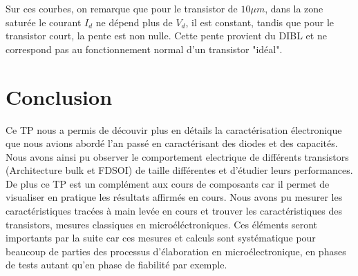 \documentclass[a4paper,11pt]{report}
\begin{document}
Sur ces courbes, on remarque que pour le transistor de $10\mu m$, dans la zone saturée le courant $I_d$ ne dépend plus de $V_d$, il est constant, tandis que pour le transistor court, la pente est non nulle. Cette pente provient du DIBL et ne correspond pas au fonctionnement normal d'un transistor "idéal".

\chapter*{Conclusion}

Ce TP nous a permis de découvir plus en détails la caractérisation électronique que nous avions abordé l'an passé en caractérisant des diodes et des capacités. Nous avons ainsi pu observer le comportement electrique de différents transistors (Architecture bulk et FDSOI) de taille différentes et d'étudier leurs performances. De plus ce TP est un complément aux cours de composants car il permet de visualiser en pratique les résultats affirmés en cours. Nous avons pu mesurer les caractéristiques tracées à main levée en cours et trouver les caractéristiques des transistors, mesures classiques en microéléctroniques. Ces éléments seront importants par la suite car ces mesures et calculs sont systématique pour beaucoup de parties des processus d'élaboration en microélectronique, en phases de tests autant qu'en phase de fiabilité par exemple.
\end{document}
